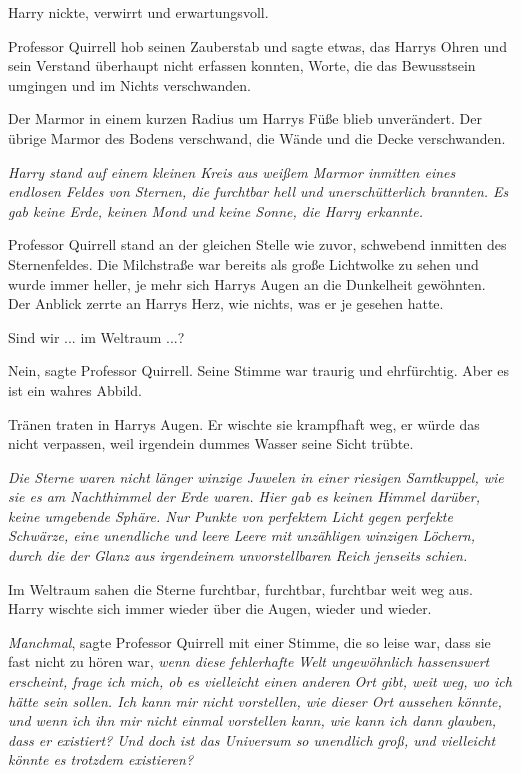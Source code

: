 Harry nickte, verwirrt und erwartungsvoll.

Professor Quirrell hob seinen Zauberstab und sagte etwas, das Harrys Ohren und
sein Verstand überhaupt nicht erfassen konnten, Worte, die das Bewusstsein
umgingen und im Nichts verschwanden.

Der Marmor in einem kurzen Radius um Harrys Füße blieb unverändert. Der übrige
Marmor des Bodens verschwand, die Wände und die Decke verschwanden.

\emph{Harry stand auf einem kleinen Kreis aus weißem Marmor inmitten eines
endlosen Feldes von Sternen, die furchtbar hell und unerschütterlich brannten.
Es gab keine Erde, keinen Mond und keine Sonne, die Harry erkannte.}

Professor Quirrell stand an der gleichen Stelle wie zuvor, schwebend inmitten
des Sternenfeldes. Die Milchstraße war bereits als große Lichtwolke zu sehen und
wurde immer heller, je mehr sich Harrys Augen an die Dunkelheit gewöhnten. Der
Anblick zerrte an Harrys Herz, wie nichts, was er je gesehen hatte.

\glqq{}Sind wir ... im Weltraum ...?\grqq{}

\glqq{}Nein\grqq{}, sagte Professor Quirrell. Seine Stimme war traurig und
ehrfürchtig. \glqq{}Aber es ist ein wahres Abbild.\grqq{}

Tränen traten in Harrys Augen. Er wischte sie krampfhaft weg, er würde das nicht
verpassen, weil irgendein dummes Wasser seine Sicht trübte.

\emph{Die Sterne waren nicht länger winzige Juwelen in einer riesigen
Samtkuppel, wie sie es am Nachthimmel der Erde waren. Hier gab es keinen Himmel
darüber, keine umgebende Sphäre. Nur Punkte von perfektem Licht gegen perfekte
Schwärze, eine unendliche und leere Leere mit unzähligen winzigen Löchern, durch
die der Glanz aus irgendeinem unvorstellbaren Reich jenseits schien.}

Im Weltraum sahen die Sterne furchtbar, furchtbar, furchtbar weit weg aus. Harry
wischte sich immer wieder über die Augen, wieder und wieder.

\glqq{}\emph{Manchmal}\grqq{}, sagte Professor Quirrell mit einer Stimme, die so
leise war, dass sie fast nicht zu hören war, \glqq{}\emph{wenn diese fehlerhafte
Welt ungewöhnlich hassenswert erscheint, frage ich mich, ob es vielleicht einen
anderen Ort gibt, weit weg, wo ich} \emph{hätte sein sollen. Ich kann mir nicht
vorstellen, wie dieser Ort aussehen könnte, und wenn ich ihn mir nicht einmal
vorstellen kann, wie kann ich dann glauben, dass er existiert? Und doch ist das
Universum so unendlich groß, und vielleicht könnte es trotzdem existieren?}

